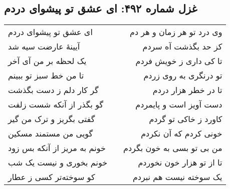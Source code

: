 \begin{center}
\section*{غزل شماره ۴۹۲: ای عشق تو پیشوای دردم}
\label{sec:492}
\begin{longtable}{l p{0.5cm} r}
ای عشق تو پیشوای دردم
&&
وی درد تو هر زمان و هر دم
\\
آیینهٔ عارضت سیه شد
&&
کز حد بگذشت آه سردم
\\
یک لحظه بر من آی آخر
&&
تا کی داری ز خویش فردم
\\
تا من خط سبز تو ببینم
&&
تو درنگری به روی زردم
\\
گر کار دلم ز دست بگذشت
&&
تا در خطر هزار دردم
\\
گو بگذر از آنکه شست زلفت
&&
دست آویز است و پایمردم
\\
گفتی بگریز و ترک من گیر
&&
کاورد ز خاکی تو گردم
\\
گویی من مستمند مسکین
&&
خونی کردم که آن نکردم
\\
خونم به مریز از آنکه بس زود
&&
من بی تو بسی به خون بگردم
\\
خونم بخوری و نیست یک شب
&&
تا از تو هزار خون نخوردم
\\
کو سوخته‌تر کسی ز عطار
&&
یک سوخته نیست هم نبردم
\\
\end{longtable}
\end{center}

